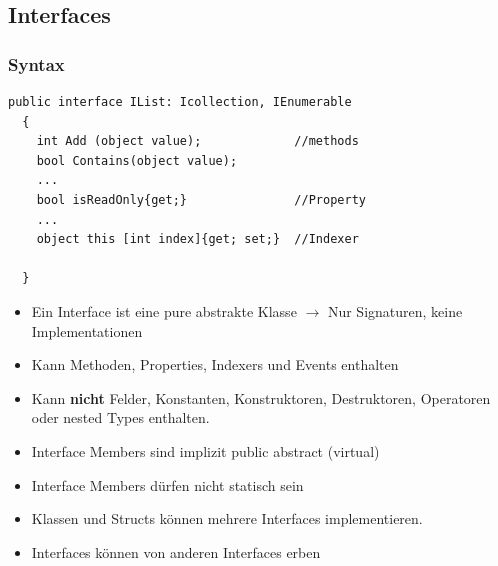 \subsection{Interfaces}
\subsubsection{Syntax}
\begin{lstlisting}[style=Csharp]
  public interface IList: Icollection, IEnumerable
  {
    int Add (object value);             //methods
    bool Contains(object value);        
    ...
    bool isReadOnly{get;}               //Property
    ...
    object this [int index]{get; set;}  //Indexer
    
  }
\end{lstlisting}
\begin{itemize}
  \item Ein Interface ist eine pure abstrakte Klasse $\rightarrow$ Nur
  Signaturen, keine Implementationen
  \item Kann Methoden, Properties, Indexers und Events enthalten
  \item Kann \textbf{nicht} Felder, Konstanten, Konstruktoren, Destruktoren,
  Operatoren oder nested Types enthalten. 
  \item Interface Members sind implizit public abstract (virtual)
  \item Interface Members dürfen nicht statisch sein
  \item Klassen und Structs können mehrere Interfaces implementieren. 
  \item Interfaces können von anderen Interfaces erben
\end{itemize}

